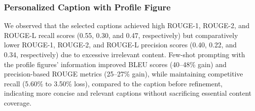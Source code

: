 \documentclass{article} %
\begin{document}
\subsubsection{\textbf{Personalized Caption with Profile Figure} }

We observed that the selected captions achieved high ROUGE-1, ROUGE-2, and ROUGE-L recall scores (0.55, 0.30, and 0.47, respectively) but comparatively lower ROUGE-1, ROUGE-2, and ROUGE-L precision scores (0.40, 0.22, and 0.34, respectively) due to excessive irrelevant content. 
Few-shot prompting with the profile figures’ information improved BLEU scores (40–48\% gain) and precision-based ROUGE metrics (25–27\% gain), while maintaining competitive recall (5.60\% to 3.50\% loss), compared to the caption before refinement, indicating more concise and relevant captions without sacrificing essential content coverage.
\end{document}
